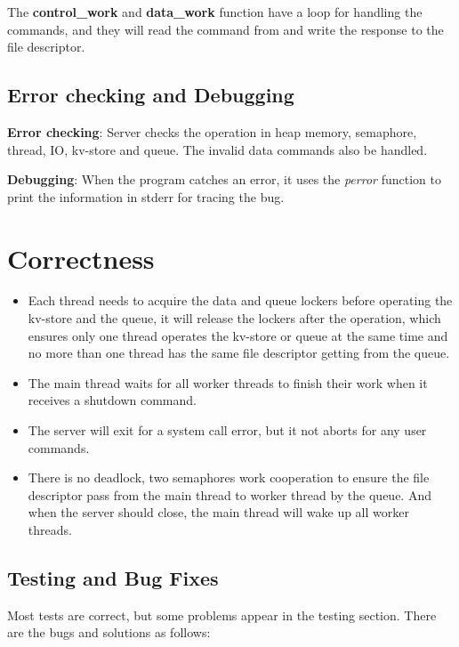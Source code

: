 \documentclass[10pt, a4paper]{article}
\begin{document}
The \textbf{control\_work} and \textbf{data\_work} function have a loop for handling the commands, and they will read the command from and write the response to the file descriptor.


\subsection{Error checking and Debugging}
    
\textbf{Error checking}: Server checks the operation in heap memory, semaphore, thread, IO, kv-store and queue. The invalid data commands also be handled.
    
\textbf{Debugging}: When the program catches an error, it uses the \textit{perror} function to print the information in stderr for tracing the bug.
    
    
\section{Correctness}
    
\begin{itemize}
    \item Each thread needs to acquire the data and queue lockers before operating the kv-store and the queue, it will release the lockers after the operation, which ensures only one thread operates the kv-store or queue at the same time and no more than one thread has the same file descriptor getting from the queue.
    \item The main thread waits for all worker threads to finish their work when it receives a shutdown command.
    \item The server will exit for a system call error, but it not aborts for any user commands.
    \item There is no deadlock, two semaphores work cooperation to ensure the file descriptor pass from the main thread to worker thread by the queue. And when the server should close, the main thread will wake up all worker threads.
\end{itemize}
    
    
\subsection{Testing and Bug Fixes}

Most tests are correct, but some problems appear in the testing section. There are the bugs and solutions as follows:
\end{document}
